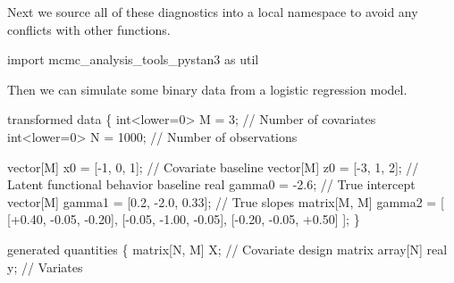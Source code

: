 \documentclass[
  letterpaper,
  DIV=11,
  numbers=noendperiod]{scrartcl}
\newenvironment{Shaded}{\begin{snugshade}}{\end{snugshade}}
\newcommand{\CommentTok}[1]{\textcolor[rgb]{0.37,0.37,0.37}{#1}}
\newcommand{\DataTypeTok}[1]{\textcolor[rgb]{0.68,0.00,0.00}{#1}}
\newcommand{\DecValTok}[1]{\textcolor[rgb]{0.68,0.00,0.00}{#1}}
\newcommand{\FloatTok}[1]{\textcolor[rgb]{0.68,0.00,0.00}{#1}}
\newcommand{\ImportTok}[1]{\textcolor[rgb]{0.00,0.46,0.62}{#1}}
\newcommand{\KeywordTok}[1]{\textcolor[rgb]{0.00,0.23,0.31}{#1}}
\newcommand{\NormalTok}[1]{\textcolor[rgb]{0.00,0.23,0.31}{#1}}
\begin{document}
Next we source all of these diagnostics into a local namespace to avoid
any conflicts with other functions.

\begin{Shaded}
\begin{Highlighting}[]
\ImportTok{import}\NormalTok{ mcmc\_analysis\_tools\_pystan3 }\ImportTok{as}\NormalTok{ util}
\end{Highlighting}
\end{Shaded}

Then we can simulate some binary data from a logistic regression model.

\begin{codelisting}

\caption{\texttt{simu\textbackslash\_logistic\textbackslash\_reg.stan}}

\begin{Shaded}
\begin{Highlighting}[]
\KeywordTok{transformed data}\NormalTok{ \{}
  \DataTypeTok{int}\NormalTok{\textless{}}\KeywordTok{lower}\NormalTok{=}\DecValTok{0}\NormalTok{\textgreater{} M = }\DecValTok{3}\NormalTok{;         }\CommentTok{// Number of covariates}
  \DataTypeTok{int}\NormalTok{\textless{}}\KeywordTok{lower}\NormalTok{=}\DecValTok{0}\NormalTok{\textgreater{} N = }\DecValTok{1000}\NormalTok{;      }\CommentTok{// Number of observations}
  
  \DataTypeTok{vector}\NormalTok{[M] x0 = [{-}}\DecValTok{1}\NormalTok{, }\DecValTok{0}\NormalTok{, }\DecValTok{1}\NormalTok{]\textquotesingle{}; }\CommentTok{// Covariate baseline}
  \DataTypeTok{vector}\NormalTok{[M] z0 = [{-}}\DecValTok{3}\NormalTok{, }\DecValTok{1}\NormalTok{, }\DecValTok{2}\NormalTok{]\textquotesingle{}; }\CommentTok{// Latent functional behavior baseline}
  \DataTypeTok{real}\NormalTok{ gamma0 = {-}}\FloatTok{2.6}\NormalTok{;                      }\CommentTok{// True intercept}
  \DataTypeTok{vector}\NormalTok{[M] gamma1 = [}\FloatTok{0.2}\NormalTok{, {-}}\FloatTok{2.0}\NormalTok{, }\FloatTok{0.33}\NormalTok{]\textquotesingle{};   }\CommentTok{// True slopes}
  \DataTypeTok{matrix}\NormalTok{[M, M] gamma2 = [ [+}\FloatTok{0.40}\NormalTok{, {-}}\FloatTok{0.05}\NormalTok{, {-}}\FloatTok{0.20}\NormalTok{],}
\NormalTok{                          [{-}}\FloatTok{0.05}\NormalTok{, {-}}\FloatTok{1.00}\NormalTok{, {-}}\FloatTok{0.05}\NormalTok{],}
\NormalTok{                          [{-}}\FloatTok{0.20}\NormalTok{, {-}}\FloatTok{0.05}\NormalTok{, +}\FloatTok{0.50}\NormalTok{] ];}
\NormalTok{\}}

\KeywordTok{generated quantities}\NormalTok{ \{}
  \DataTypeTok{matrix}\NormalTok{[N, M] X; }\CommentTok{// Covariate design matrix}
  \DataTypeTok{array}\NormalTok{[N] }\DataTypeTok{real}\NormalTok{ y;      }\CommentTok{// Variates}


\end{Highlighting}
\end{Shaded}
\end{codelisting}
\end{document}

